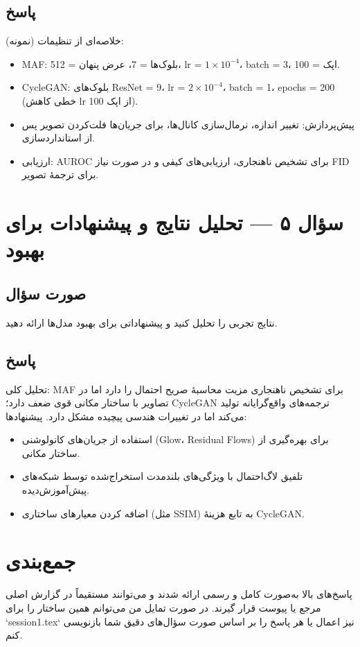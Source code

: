 \subsection{پاسخ}
خلاصه‌ای از تنظیمات (نمونه):
\begin{itemize}
	\item MAF: بلوک‌ها = 7، عرض پنهان = 512، lr = $1\times10^{-4}$، batch = 3، اپک = 100.
	\item CycleGAN: بلوک‌های ResNet = 9، lr = $2\times10^{-4}$، batch = 1، epochs = 200 (خطی کاهش lr از اپک 100).
	\item پیش‌پردازش: تغییر اندازه، نرمال‌سازی کانال‌ها، برای جریان‌ها فلت‌کردن تصویر پس از استانداردسازی.
	\item ارزیابی: AUROC برای تشخیص ناهنجاری، ارزیابی‌های کیفی و در صورت نیاز FID برای ترجمهٔ تصویر.
\end{itemize}

\section{سؤال ۵ — تحلیل نتایج و پیشنهادات برای بهبود}
\subsection{صورت سؤال}
نتایج تجربی را تحلیل کنید و پیشنهاداتی برای بهبود مدل‌ها ارائه دهید.

\subsection{پاسخ}
تحلیل کلی: MAF برای تشخیص ناهنجاری مزیت محاسبهٔ صریح احتمال را دارد اما در تصاویر با ساختار مکانی قوی ضعف دارد؛ CycleGAN ترجمه‌های واقع‌گرایانه تولید می‌کند اما در تغییرات هندسی پیچیده مشکل دارد. پیشنهادها:
\begin{itemize}
	\item استفاده از جریان‌های کانولوشنی (Glow، Residual Flows) برای بهره‌گیری از ساختار مکانی.
	\item تلفیق لاگ‌احتمال با ویژگی‌های بلندمدت استخراج‌شده توسط شبکه‌های پیش‌آموزش‌دیده.
	\item اضافه کردن معیارهای ساختاری (مثل SSIM) به تابع هزینهٔ CycleGAN.
\end{itemize}

\section{جمع‌بندی}
پاسخ‌های بالا به‌صورت کامل و رسمی ارائه شدند و می‌توانند مستقیماً در گزارش اصلی مرجع یا پیوست قرار گیرند. در صورت تمایل من می‌توانم همین ساختار را برای `session1.tex` نیز اعمال یا هر پاسخ را بر اساس صورت سؤال‌های دقیق شما بازنویسی کنم.

